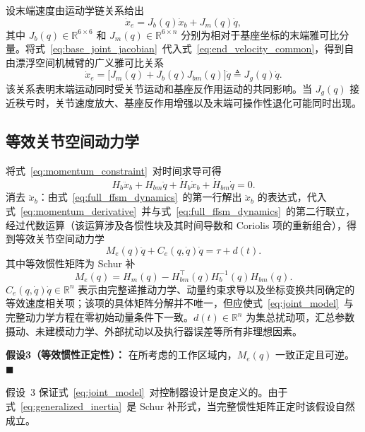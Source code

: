 设末端速度由运动学链关系给出
\begin{equation}
\dot x_e = J_b(q)\dot x_b + J_m(q)\dot q,
\label{eq:end_velocity_common}
\end{equation}
其中 \(J_b(q)\in\mathbb R^{6\times6}\) 和 \(J_m(q)\in\mathbb R^{6\times n}\) 分别为相对于基座坐标的末端雅可比分量。将式~\eqref{eq:base_joint_jacobian}~代入式~\eqref{eq:end_velocity_common}，得到自由漂浮空间机械臂的广义雅可比关系
\begin{equation}
\dot x_e = \bigl[J_m(q) + J_b(q)J_{bm}(q)\bigr]\dot q \triangleq J_g(q)\dot q.
\label{eq:generalized_jacobian}
\end{equation}
该关系表明末端运动同时受关节运动和基座反作用运动的共同影响。当 \(J_g(q)\) 接近秩亏时，关节速度放大、基座反作用增强以及末端可操作性退化可能同时出现。

\subsection{等效关节空间动力学}

将式~\eqref{eq:momentum_constraint}~对时间求导可得
\begin{equation}
H_b\ddot x_b + H_{bm}\ddot q + \dot H_b\dot x_b + \dot H_{bm}\dot q = 0.
\label{eq:momentum_derivative}
\end{equation}
消去 \(\ddot x_b\)：由式~\eqref{eq:full_ffsm_dynamics}~的第一行解出 \(\ddot x_b\) 的表达式，代入式~\eqref{eq:momentum_derivative}~并与式~\eqref{eq:full_ffsm_dynamics}~的第二行联立，经过代数运算（该运算涉及各惯性块及其时间导数和 Coriolis 项的重新组合），得到等效关节空间动力学
\begin{equation}
M_e(q)\ddot q + C_e(q,\dot q)\dot q = \tau + d(t).
\label{eq:joint_model}
\end{equation}
其中等效惯性矩阵为 Schur 补
\begin{equation}
M_e(q) = H_m(q) - H_{bm}^\top(q)H_b^{-1}(q)H_{bm}(q).
\label{eq:generalized_inertia}
\end{equation}
\(C_e(q,\dot q)\dot q \in\mathbb R^n\) 表示由完整递推动力学、动量约束求导以及坐标变换共同确定的等效速度相关项；该项的具体矩阵分解并不唯一，但应使式~\eqref{eq:joint_model}~与完整动力学方程在零初始动量条件下一致。\(d(t)\in\mathbb R^n\) 为集总扰动项，汇总参数摄动、未建模动力学、外部扰动以及执行器误差等所有非理想因素。

\noindent\textbf{假设3（等效惯性正定性）：} 在所考虑的工作区域内，\(M_e(q)\) 一致正定且可逆。\hfill\(\blacksquare\)

假设~3 保证式~\eqref{eq:joint_model}~对控制器设计是良定义的。由于式~\eqref{eq:generalized_inertia}~是 Schur 补形式，当完整惯性矩阵正定时该假设自然成立。

